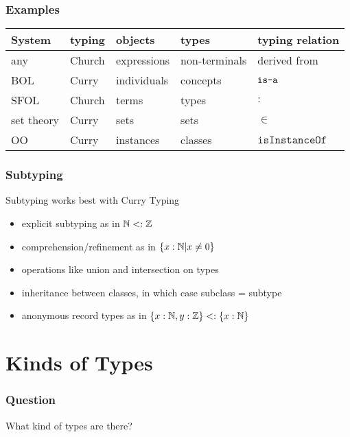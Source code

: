 \begin{frame}\frametitle{Examples}
\begin{center}
\begin{tabular}{l|llll}
System & typing & objects & types & typing relation\\
\hline
any & Church & expressions & non-terminals & derived from\\
BOL & Curry  & individuals & concepts & $\mathop{\texttt{is-a}}$\\
SFOL & Church & terms & types & $:$ \\
set theory & Curry & sets & sets & $\in$ \\
OO & Curry & instances & classes & $\mathtt{isInstanceOf}$\\
\end{tabular}
\end{center}
\end{frame}

\begin{frame}\frametitle{Subtyping}
Subtyping works best with Curry Typing
\begin{itemize}
 \item explicit subtyping as in $\mathbb{N}<:\mathbb{Z}$
 \item comprehension/refinement as in $\{x:\mathbb{N}|x\neq 0\}$
 \item operations like union and intersection on types
 \item inheritance between classes, in which case subclass = subtype
 \item anonymous record types as in $\{x:\mathbb{N},y:\mathbb{Z}\}<:\{x:\mathbb{N}\}$
\end{itemize}
\end{frame}

\section{Kinds of Types}

\begin{frame}\frametitle{Question}
What kind of types are there?
\end{frame}


